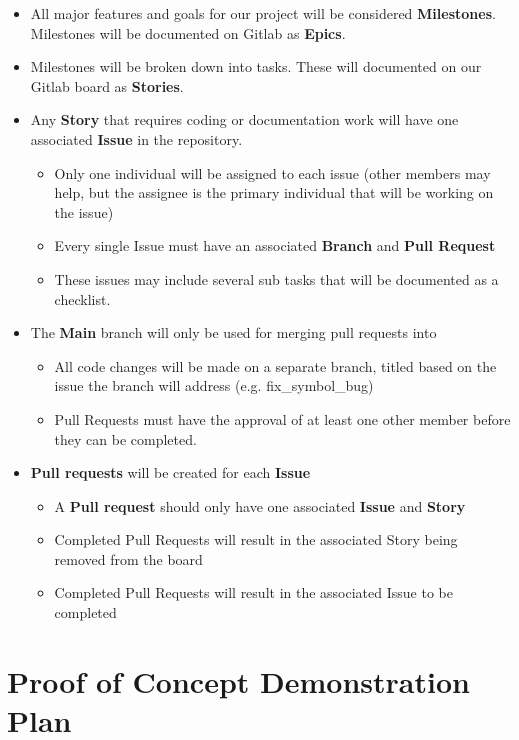 \documentclass{article}
\begin{document}
\begin{itemize}
\item All major features and goals for our project will be considered \textbf{Milestones}. Milestones will be documented on Gitlab as \textbf{Epics}.
\item Milestones will be broken down into tasks. These will documented on our Gitlab board as \textbf{Stories}.
\item Any \textbf{Story} that requires coding or documentation work will have one associated \textbf{Issue} in the repository.
    \begin{itemize}
    \item Only one individual will be assigned to each issue (other members may help, but the assignee is the primary individual that will be working on the issue)
    \item Every single Issue must have an associated \textbf{Branch} and \textbf{Pull Request}
    \item These issues may include several sub tasks that will be documented as a checklist.
    \end{itemize}
\item The \textbf{Main} branch will only be used for merging pull requests into
    \begin{itemize}
    \item All code changes will be made on a separate branch, titled based on the issue the branch will address (e.g. fix\_symbol\_bug)
    \item Pull Requests must have the approval of at least one other member before they can be completed.
    \end{itemize}
\item \textbf{Pull requests} will be created for each \textbf{Issue}
    \begin{itemize}
    \item A \textbf{Pull request} should only have one associated \textbf{Issue} and \textbf{Story}
    \item Completed Pull Requests will result in the associated Story being removed from the board
    \item Completed Pull Requests will result in the associated Issue to be completed
    \end{itemize}
\end{itemize}

\section{Proof of Concept Demonstration Plan}
\end{document}
